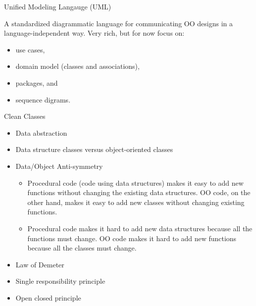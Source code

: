 \documentclass{beamer}
\begin{document}
\begin{frame}[fragile]{Unified Modeling Langauge (UML)}


A standardized diagrammatic language for communicating OO designs in a language-independent way.  Very rich, but for now focus on:
\begin{itemize}
\item use cases,
\item domain model (classes and associations),
\item packages, and
\item sequence digrams.
\end{itemize}


\end{frame}


\begin{frame}[fragile]{Clean Classes}


\begin{itemize}
\item Data abstraction
\item Data structure classes versus object-oriented classes
\item Data/Object Anti-symmetry
\begin{itemize}
\item Procedural code (code using data structures) makes it easy to add new functions without changing the existing data structures. OO code, on the other hand, makes it easy to add new classes without changing existing functions.
\item Procedural code makes it hard to add new data structures because all the functions must change. OO code makes it hard to add new functions because all the classes must change.
\end{itemize}
\item Law of Demeter
\item Single responsibility principle
\item Open closed principle
\end{itemize}


\end{frame}







\end{document}
